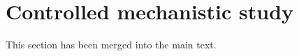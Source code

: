 \section{Controlled mechanistic study}
\label{app:controlled}
This section has been merged into the main text.
